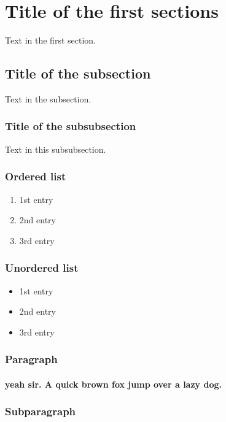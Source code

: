 \documentclass[a4paper]{article}
\begin{document}
\section{Title of the first sections}

Text in the first section.

\subsection{Title of the subsection}

Text in the subsection.

\subsubsection{Title of the subsubsection}

Text in this subsubsection.

\subsubsection{Ordered list}

\begin{enumerate}
  \item 1st entry
  \item 2nd entry
  \item 3rd entry
\end{enumerate}


\subsubsection{Unordered list}

\begin{itemize}
  \item 1st entry
  \item 2nd entry
  \item 3rd entry
\end{itemize}

\subsubsection{Paragraph}

\paragraph{
  yeah sir. A quick brown fox jump over a lazy dog.
}

\subsubsection{Subparagraph}
\end{document}
